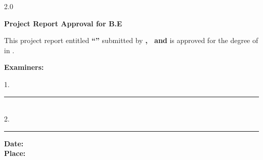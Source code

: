 \thispagestyle{empty}
\begin{spacing}{2.0}
\begin{center}
    {\Large \textbf{Project Report Approval for B.E}}
\end{center}
\vspace{0.5cm}
\justifying
This project report entitled
\textbf{``\ProjectTitleFormatted''}
submitted by \textbf{\StudentOne, \StudentTwo\ and \StudentThree}
is approved for the degree of \textbf{\ProjectDegreeShort} in \textbf{\ProjectDepartmentShort}.

\vspace{2cm}
\hspace{235pt} \textbf{Examiners:}
\begin{flushright}
1.\ \rule{7cm}{0.4pt} \vspace{2em} \\
2.\ \rule{7cm}{0.4pt}
\end{flushright}
\vfill
\noindent \textbf{Date:} \\[2em]
\textbf{Place:}
\end{spacing}
\clearpage
